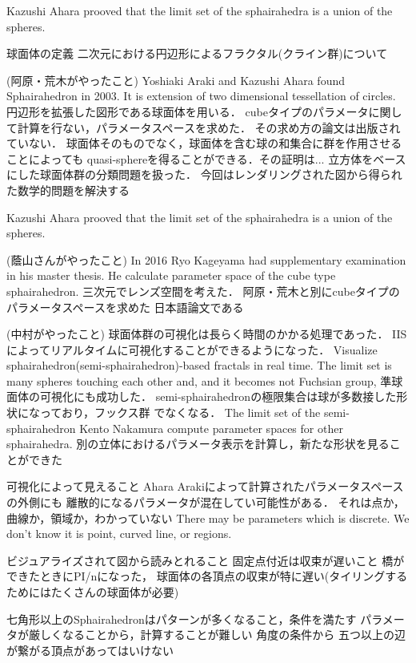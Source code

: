\documentclass[dvipdfmx]{interact}
\theoremstyle{plain}%
\theoremstyle{definition}
\theoremstyle{remark}
\theoremstyle{problemstyle}
\begin{document}
Kazushi Ahara prooved that the limit set of the sphairahedra
is a union of the spheres.

球面体の定義
二次元における円辺形によるフラクタル(クライン群)について

(阿原・荒木がやったこと)
Yoshiaki Araki and Kazushi Ahara found Sphairahedron in 2003.
It is extension of two dimensional tessellation of circles.
円辺形を拡張した図形である球面体を用いる．
cubeタイプのパラメータに関して計算を行ない，パラメータスペースを求めた．
その求め方の論文は出版されていない．
球面体そのものでなく，球面体を含む球の和集合に群を作用させることによっても
quasi-sphereを得ることができる．その証明は...
立方体をベースにした球面体群の分類問題を扱った．
今回はレンダリングされた図から得られた数学的問題を解決する

Kazushi Ahara prooved that the limit set of the sphairahedra
is a union of the spheres.

(蔭山さんがやったこと)
In 2016 Ryo Kageyama had supplementary examination in his master thesis.
He calculate parameter space of the cube type sphairahedron.
三次元でレンズ空間を考えた．
阿原・荒木と別にcubeタイプのパラメータスペースを求めた
日本語論文である

(中村がやったこと)
球面体群の可視化は長らく時間のかかる処理であった．
IISによってリアルタイムに可視化することができるようになった．
Visualize sphairahedron(semi-sphairahedron)-based fractals in real time.
The limit set is many spheres touching each other and,
and it becomes not Fuchsian group,
準球面体の可視化にも成功した．
semi-sphairahedronの極限集合は球が多数接した形状になっており，フックス群
でなくなる．
The limit set of the semi-sphairahedron
Kento Nakamura compute parameter spaces for other sphairahedra.
別の立体におけるパラメータ表示を計算し，新たな形状を見ることができた

可視化によって見えること
Ahara Arakiによって計算されたパラメータスペースの外側にも
離散的になるパラメータが混在してい可能性がある．
それは点か，曲線か，領域か，わかっていない
There may be parameters which is discrete.
We don't know it is point, curved line, or regions.

ビジュアライズされて図から読みとれること
固定点付近は収束が遅いこと
橋ができたときにPI/nになった，
球面体の各頂点の収束が特に遅い(タイリングするためにはたくさんの球面体が必要)

七角形以上のSphairahedronはパターンが多くなること，条件を満たす
パラメータが厳しくなることから，計算することが難しい
角度の条件から
五つ以上の辺が繋がる頂点があってはいけない
\end{document}
